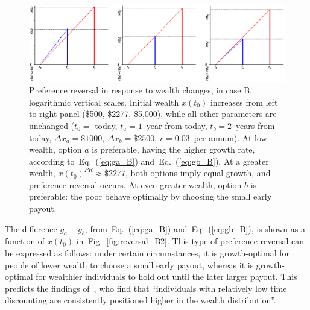 \documentclass[11pt]{article}
\newcommand{\eref}[1]{Eq.~(\ref{eq:#1})}
\newcommand{\flabel}[1]{\label{fig:#1}}
\newcommand{\fref}[1]{Fig.~\ref{fig:#1}}
\newcommand{\Dx}{\Delta x}
\numberwithin{equation}{section}
\begin{document}
\begin{figure}[!htb]
\centering
\includegraphics[width=1.0\textwidth]{./figures/reversals_B.eps}
\caption{Preference reversal in response to wealth changes, in case B, logarithmic vertical scales. Initial wealth $x(t_0)$ increases from left to right panel (\$500, \$2277, \$5,000), while all other parameters are unchanged ($t_0=$ today, $t_a=1$~year from today, $t_b=2$~years from today, $\Dx_a=\$1000$, $\Dx_b=\$2500$, $r=0.03$~per annum). At low wealth, option $a$ is preferable, having the higher growth rate, according to~\eref{ga_B} and~\eref{gb_B}. At a greater wealth, $x(t_0)^{PR}\approx \$2277$, both options imply equal growth, and preference reversal occurs. At even greater wealth, option $b$ is preferable: the poor behave optimally by choosing the small early payout.}
\flabel{reversal_B}
\end{figure}


The difference $g_a-g_b$, from~\eref{ga_B} and~\eref{gb_B}, is shown as a function of $x(t_0)$ in~\fref{reversal_B2}. This type of preference reversal can be expressed as follows: under certain circumstances, it is growth-optimal for people of lower wealth to choose a small early payout, whereas it is growth-optimal for wealthier individuals to hold out until the later larger payout. This predicts the findings of~\citet{epper2018time}, who find that ``individuals with relatively low time discounting are consistently positioned higher in the wealth distribution''.
\end{document}
